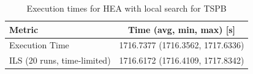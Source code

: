 \begin{table}[h!]
\centering
\begin{tabular}{lc}
\hline
Metric & Time (avg, min, max) [s] \\
\hline
Execution Time & 1716.7377 (1716.3562, 1717.6336) \\
ILS (20 runs, time-limited) & 1716.6172 (1716.4109, 1717.8342) \\
\hline
\end{tabular}
\caption{Execution times for HEA with local search for TSPB}
\label{tab:TSPB_hea_with_ls_timings}
\end{table}
